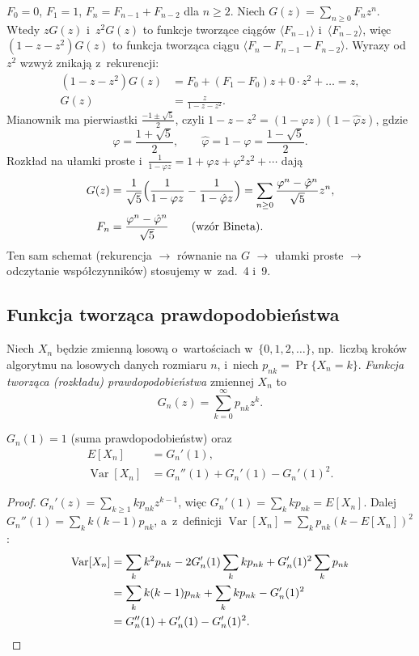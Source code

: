 \documentclass[11pt]{article}
\begin{document}
$F_0=0$, $F_1=1$, $F_n=F_{n-1}+F_{n-2}$ dla $n\ge2$. Niech
$G(z)=\sum_{n\ge0}F_nz^n$. Wtedy $zG(z)$ i~$z^2G(z)$ to funkcje tworzące
ciągów $\langle F_{n-1}\rangle$ i~$\langle F_{n-2}\rangle$, więc
$(1-z-z^2)G(z)$ to funkcja tworząca ciągu $\langle F_n-F_{n-1}-F_{n-2}\rangle$.
Wyrazy od $z^2$ wzwyż znikają z~rekurencji:
\begin{align*}
(1-z-z^2)G(z)&=F_0+(F_1-F_0)z+0\cdot z^2+\dots=z,\\
G(z)&=\frac z{1-z-z^2}.
\end{align*}
Mianownik ma pierwiastki $\frac{-1\pm\sqrt5}2$, czyli
$1-z-z^2=(1-\varphi z)(1-\hat\varphi z)$, gdzie
\[
\varphi=\frac{1+\sqrt5}2,\qquad\hat\varphi=1-\varphi=\frac{1-\sqrt5}2.
\]
Rozkład na ułamki proste i~$\frac1{1-\varphi z}=1+\varphi z+\varphi^2z^2+\cdots$ dają
\begin{align*}
G(z)&=\frac1{\sqrt5}\Bigl(\frac1{1-\varphi z}-\frac1{1-\hat\varphi z}\Bigr)
=\sum_{n\ge0}\frac{\varphi^n-\hat\varphi^n}{\sqrt5}z^n,\\
F_n&=\frac{\varphi^n-\hat\varphi^n}{\sqrt5}\qquad\text{(wzór Bineta)}.
\end{align*}
Ten sam schemat (rekurencja $\to$ równanie na $G$ $\to$ ułamki proste $\to$
odczytanie współczynników) stosujemy w~zad.~4 i~9.

\subsection*{Funkcja tworząca prawdopodobieństwa}

\begin{definicja}[z wykładu]\label{def:pgf}
Niech $X_n$ będzie zmienną losową o~wartościach w~$\{0,1,2,\dots\}$, np.\
liczbą kroków algorytmu na losowych danych rozmiaru $n$, i~niech
$p_{nk}=\Pr\{X_n=k\}$. \emph{Funkcja tworząca (rozkładu)
prawdopodobieństwa} zmiennej $X_n$ to
\[
G_n(z)=\sum_{k=0}^\infty p_{nk}z^k.
\]
\end{definicja}

\begin{fakt}[z wykładu]\label{fakt:pgf}
$G_n(1)=1$ (suma prawdopodobieństw) oraz
\begin{align*}
E[X_n]&=G_n'(1),\\
\operatorname{Var}[X_n]&=G_n''(1)+G_n'(1)-G_n'(1)^2.
\end{align*}
\end{fakt}
\begin{proof}
$G_n'(z)=\sum_{k\ge1}kp_{nk}z^{k-1}$, więc $G_n'(1)=\sum_kkp_{nk}=E[X_n]$.
Dalej $G_n''(1)=\sum_kk(k-1)p_{nk}$, a~z~definicji
$\operatorname{Var}[X_n]=\sum_kp_{nk}(k-E[X_n])^2$:
\begin{align*}
\operatorname{Var}[X_n]&=\sum_kk^2p_{nk}-2G_n'(1)\sum_kkp_{nk}+G_n'(1)^2\sum_kp_{nk}\\
&=\sum_kk(k-1)p_{nk}+\sum_kkp_{nk}-G_n'(1)^2\\
&=G_n''(1)+G_n'(1)-G_n'(1)^2.\qedhere
\end{align*}
\end{proof}
\end{document}

